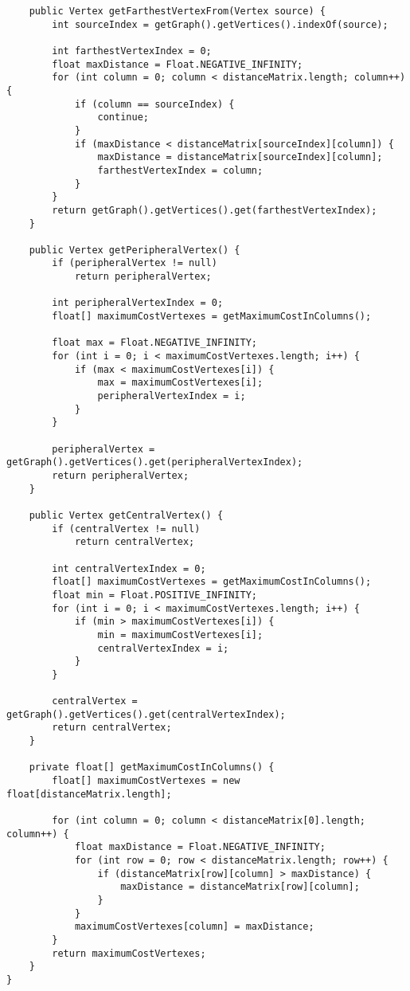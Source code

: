 \documentclass[a4paper, 12pt]{article}
\begin{document}
\begin{verbatim}
    public Vertex getFarthestVertexFrom(Vertex source) {
        int sourceIndex = getGraph().getVertices().indexOf(source);

        int farthestVertexIndex = 0;
        float maxDistance = Float.NEGATIVE_INFINITY;
        for (int column = 0; column < distanceMatrix.length; column++) {
            if (column == sourceIndex) {
                continue;
            }
            if (maxDistance < distanceMatrix[sourceIndex][column]) {
                maxDistance = distanceMatrix[sourceIndex][column];
                farthestVertexIndex = column;
            }
        }
        return getGraph().getVertices().get(farthestVertexIndex);
    }

    public Vertex getPeripheralVertex() {
        if (peripheralVertex != null)
            return peripheralVertex;

        int peripheralVertexIndex = 0;
        float[] maximumCostVertexes = getMaximumCostInColumns();

        float max = Float.NEGATIVE_INFINITY;
        for (int i = 0; i < maximumCostVertexes.length; i++) {
            if (max < maximumCostVertexes[i]) {
                max = maximumCostVertexes[i];
                peripheralVertexIndex = i;
            }
        }

        peripheralVertex = getGraph().getVertices().get(peripheralVertexIndex);
        return peripheralVertex;
    }

    public Vertex getCentralVertex() {
        if (centralVertex != null)
            return centralVertex;

        int centralVertexIndex = 0;
        float[] maximumCostVertexes = getMaximumCostInColumns();
        float min = Float.POSITIVE_INFINITY;
        for (int i = 0; i < maximumCostVertexes.length; i++) {
            if (min > maximumCostVertexes[i]) {
                min = maximumCostVertexes[i];
                centralVertexIndex = i;
            }
        }

        centralVertex = getGraph().getVertices().get(centralVertexIndex);
        return centralVertex;
    }

    private float[] getMaximumCostInColumns() {
        float[] maximumCostVertexes = new float[distanceMatrix.length];

        for (int column = 0; column < distanceMatrix[0].length; column++) {
            float maxDistance = Float.NEGATIVE_INFINITY;
            for (int row = 0; row < distanceMatrix.length; row++) {
                if (distanceMatrix[row][column] > maxDistance) {
                    maxDistance = distanceMatrix[row][column];
                }
            }
            maximumCostVertexes[column] = maxDistance;
        }
        return maximumCostVertexes;
    }
}


\end{verbatim}
\end{document}
